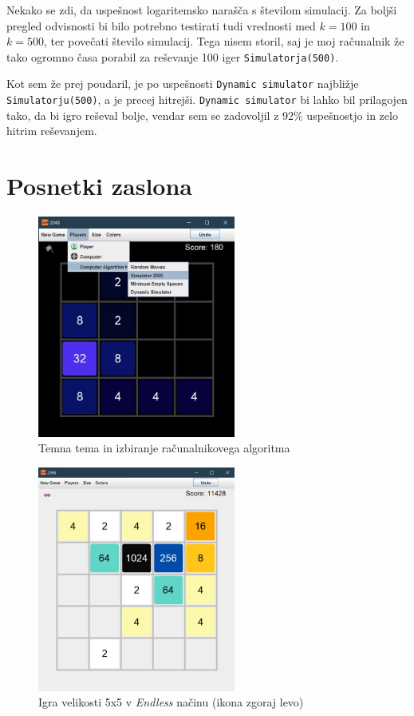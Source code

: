 \documentclass{article}
\begin{document}
Nekako se zdi, da uspešnost logaritemsko narašča s številom simulacij. Za boljši pregled odvisnosti bi bilo potrebno testirati tudi vrednosti med $k=100$ in $k=500$, ter povečati število simulacij. Tega nisem storil, saj je moj računalnik že tako ogromno časa porabil za reševanje 100 iger \texttt{Simulatorja(500)}.

Kot sem že prej poudaril, je po uspešnosti \texttt{Dynamic simulator} najbližje \texttt{Simulatorju(500)}, a je precej hitrejši. \texttt{Dynamic simulator} bi lahko bil prilagojen tako, da bi igro reševal bolje, vendar sem se zadovoljil z 92\% uspešnostjo in zelo hitrim reševanjem.

\pagebreak
\section{Posnetki zaslona}

\begin{figure}[ht!]
\centering
\includegraphics[width=6.5cm]{scr1.jpg}
\caption{Temna tema in izbiranje računalnikovega algoritma}
\label{scr1}
\end{figure}

\begin{figure}[ht!]
\centering
\includegraphics[width=6.5cm]{scr2.jpg}
\caption{Igra velikosti 5x5 v \emph{Endless} načinu (ikona zgoraj levo)}
\label{scr2}
\end{figure}
\end{document}
